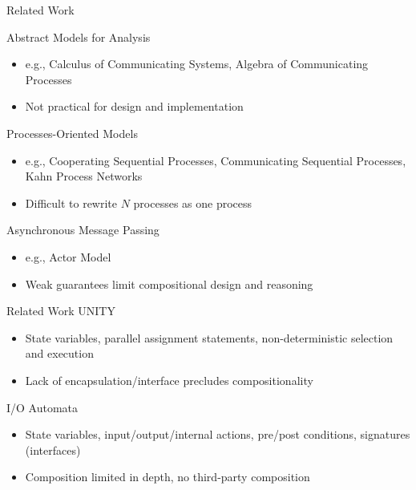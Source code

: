 \documentclass{beamer}
\begin{document}




\begin{frame}{Related Work}

  Abstract Models for Analysis
  \begin{itemize}
  \item e.g., Calculus of Communicating Systems, Algebra of Communicating Processes
  \item Not practical for design and implementation
  \end{itemize}

  Processes-Oriented Models
  \begin{itemize}
  \item e.g., Cooperating Sequential Processes, Communicating Sequential Processes, Kahn Process Networks
  \item Difficult to rewrite $N$ processes as one process
  \end{itemize}

  Asynchronous Message Passing
  \begin{itemize}
  \item e.g., Actor Model
  \item Weak guarantees limit compositional design and reasoning
  \end{itemize}
\end{frame}

\begin{frame}{Related Work}
  UNITY
  \begin{itemize}
  \item State variables, parallel assignment statements, non-deterministic selection and execution
  \item Lack of encapsulation/interface precludes compositionality
  \end{itemize}

  I/O Automata
  \begin{itemize}
  \item State variables, input/output/internal actions, pre/post conditions, signatures (interfaces)
  \item Composition limited in depth, no third-party composition
  \end{itemize}

\end{frame}
\end{document}
